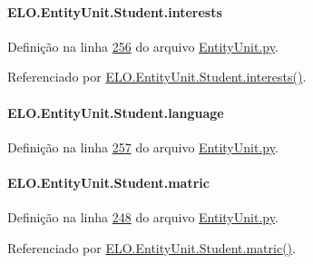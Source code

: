 \paragraph[{interests}]{\setlength{\rightskip}{0pt plus 5cm}E\+L\+O.\+Entity\+Unit.\+Student.\+interests}\label{classELO_1_1EntityUnit_1_1Student_a8777212f16975f658ff8f75e47f2c554}


Definição na linha \hyperlink{EntityUnit_8py_source_l00256}{256} do arquivo \hyperlink{EntityUnit_8py_source}{Entity\+Unit.\+py}.



Referenciado por \hyperlink{classELO_1_1EntityUnit_1_1Student_a8e5d848197b740f89635152692eea39f}{E\+L\+O.\+Entity\+Unit.\+Student.\+interests()}.

\hypertarget{classELO_1_1EntityUnit_1_1Student_ad58a5d0f4e75b34e6c2b93ac05b59faf}{}
\paragraph[{language}]{\setlength{\rightskip}{0pt plus 5cm}E\+L\+O.\+Entity\+Unit.\+Student.\+language}\label{classELO_1_1EntityUnit_1_1Student_ad58a5d0f4e75b34e6c2b93ac05b59faf}


Definição na linha \hyperlink{EntityUnit_8py_source_l00257}{257} do arquivo \hyperlink{EntityUnit_8py_source}{Entity\+Unit.\+py}.

\hypertarget{classELO_1_1EntityUnit_1_1Student_a7a58dc9ae8d071372ef2036a82fcb3ae}{}
\paragraph[{matric}]{\setlength{\rightskip}{0pt plus 5cm}E\+L\+O.\+Entity\+Unit.\+Student.\+matric}\label{classELO_1_1EntityUnit_1_1Student_a7a58dc9ae8d071372ef2036a82fcb3ae}


Definição na linha \hyperlink{EntityUnit_8py_source_l00248}{248} do arquivo \hyperlink{EntityUnit_8py_source}{Entity\+Unit.\+py}.



Referenciado por \hyperlink{classELO_1_1EntityUnit_1_1Student_a78e51bbd0ee73338c7b5a1bad920cc85}{E\+L\+O.\+Entity\+Unit.\+Student.\+matric()}.

